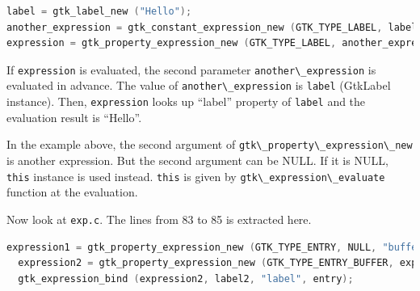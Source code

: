 \begin{lstlisting}[language=C]
label = gtk_label_new ("Hello");
another_expression = gtk_constant_expression_new (GTK_TYPE_LABEL, label);
expression = gtk_property_expression_new (GTK_TYPE_LABEL, another_expression, "label");
\end{lstlisting}

If \passthrough{\lstinline!expression!} is evaluated, the second
parameter \passthrough{\lstinline!another\_expression!} is evaluated in
advance. The value of \passthrough{\lstinline!another\_expression!} is
\passthrough{\lstinline!label!} (GtkLabel instance). Then,
\passthrough{\lstinline!expression!} looks up ``label'' property of
\passthrough{\lstinline!label!} and the evaluation result is ``Hello''.

In the example above, the second argument of
\passthrough{\lstinline!gtk\_property\_expression\_new!} is another
expression. But the second argument can be NULL. If it is NULL,
\passthrough{\lstinline!this!} instance is used instead.
\passthrough{\lstinline!this!} is given by
\passthrough{\lstinline!gtk\_expression\_evaluate!} function at the
evaluation.

Now look at \passthrough{\lstinline!exp.c!}. The lines from 83 to 85 is
extracted here.

\begin{lstlisting}[language=C]
  expression1 = gtk_property_expression_new (GTK_TYPE_ENTRY, NULL, "buffer");
  expression2 = gtk_property_expression_new (GTK_TYPE_ENTRY_BUFFER, expression1, "text");
  gtk_expression_bind (expression2, label2, "label", entry);
\end{lstlisting}

